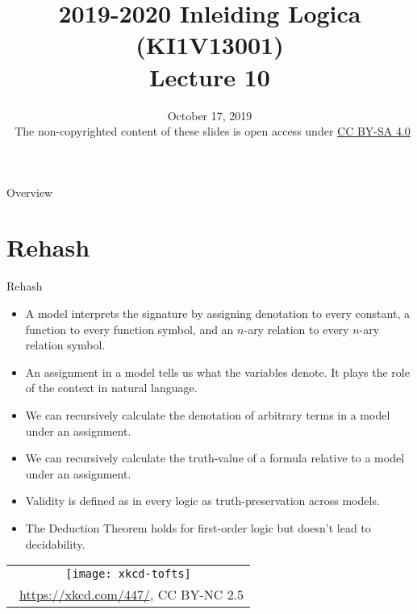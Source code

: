 \documentclass[../slides.tex]{subfiles}
\title{2019-2020 Inleiding Logica (KI1V13001) \\ Lecture 10}
\date{October 17, 2019\\[2ex] {\tiny \textcopyright~The non-copyrighted content of these slides is open access under \href{https://creativecommons.org/licenses/by-sa/4.0/}{CC BY-SA 4.0}}}
\begin{document}
\setcounter{framenumber}{304}
\begin{frame}
	\maketitle
\end{frame}

\begin{frame}{Overview}
\tableofcontents
\end{frame}

\section{Rehash}
\begin{frame}{Rehash}
	
\begin{itemize}
	
		\item \alert{A model interprets the signature by assigning denotation to every constant, a function to every function symbol, and an $n$-ary relation to every $n$-ary relation symbol.}
		
		\item An assignment in a model tells us what the variables denote. It plays the role of the context in natural language. 
	
		\item We can recursively calculate the denotation of arbitrary terms in a model under an assignment.
		
		\item We can recursively calculate the truth-value of a formula relative to a model under an assignment.
		
		\item Validity is defined as in every logic as truth-preservation across models.
		
		\item \alert{The Deduction Theorem holds for first-order logic but doesn't lead to decidability.}
										
	\end{itemize}

\end{frame}

\begin{frame}


	
	\begin{center}
		\begin{tabular}{c}
		\texttt{[image: xkcd-tofts]}\\[-1ex]
		{\tiny \textcopyright~\url{https://xkcd.com/447/}, CC BY-NC 2.5}
		\end{tabular}
		\end{center}

\end{frame}
		
\end{document}
